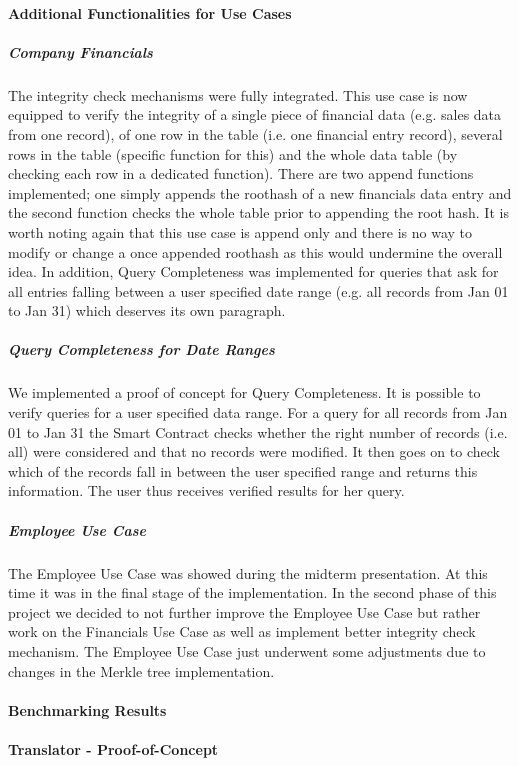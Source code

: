 \paragraph{Additional Functionalities for Use Cases}
\subparagraph{Company Financials}
The integrity check mechanisms were fully integrated. This use case is now equipped to verify the integrity of a single piece of financial data (e.g. sales data from one record), of one row in the table (i.e. one financial entry record), several rows in the table (specific function for this) and the whole data table (by checking each row in a dedicated function).
There are two append functions implemented; one simply appends the roothash of a new financials data entry and the second function checks the whole table prior to appending the root hash. It is worth noting again that this use case is append only and there is no way to modify or change a once appended roothash as this would undermine the overall idea.
In addition, Query Completeness was implemented for queries that ask for all entries falling between a user specified date range (e.g. all records from Jan 01 to Jan 31) which deserves its own paragraph.

\subparagraph{Query Completeness for Date Ranges}
We implemented a proof of concept for Query Completeness. It is possible to verify queries for a user specified data range. For a query for all records from Jan 01 to Jan 31 the Smart Contract checks whether the right number of records (i.e. all) were considered and that no records were modified. It then goes on to check which of the records fall in between the user specified range and returns this information. The user thus receives verified results for her query.

\subparagraph{Employee Use Case}
The Employee Use Case was showed during the midterm presentation. At this time it was in the final stage of the implementation. In the second phase of this project we decided to not further improve the Employee Use Case but rather work on the Financials Use Case as well as implement better integrity check mechanism. The Employee Use Case just underwent some adjustments due to changes in the Merkle tree implementation.

\paragraph{Benchmarking Results}

\paragraph{Translator - Proof-of-Concept}


